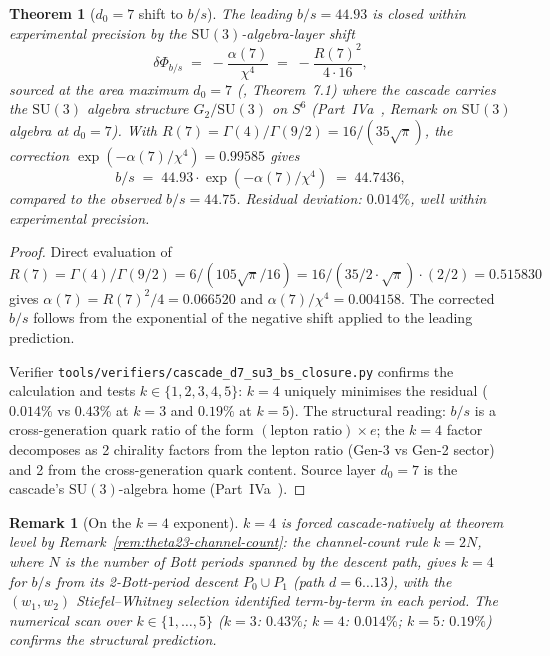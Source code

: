 \documentclass[12pt,a4paper]{article}
\newtheorem{theorem}{Theorem}[section]
\newtheorem*{remark}{Remark}
\begin{document}
\begin{theorem}[$d_0=7$ shift to $b/s$]\label{thm:bs-closure}
The leading $b/s = 44.93$ is closed within experimental precision by
the $\mathrm{SU}(3)$-algebra-layer shift
\[
\delta\Phi_{b/s} \;=\; -\frac{\alpha(7)}{\chi^4} \;=\; -\frac{R(7)^2}{4\cdot 16},
\]
sourced at the area maximum $d_0=7$ (\cite{part0}, Theorem~7.1)
where the cascade carries the $\mathrm{SU}(3)$ algebra structure
$G_2/\mathrm{SU}(3)$ on $S^6$ (Part~IVa~\cite{part4a},
Remark on $\mathrm{SU}(3)$ algebra at $d_0=7$).
With $R(7) = \Gamma(4)/\Gamma(9/2) = 16/(35\sqrt{\pi})$, the
correction
$\exp(-\alpha(7)/\chi^4) = 0.99585$ gives
\[
b/s \;=\; 44.93 \cdot \exp(-\alpha(7)/\chi^4) \;=\; 44.7436,
\]
compared to the observed $b/s = 44.75$. Residual deviation:
$0.014\%$, well within experimental precision.
\end{theorem}
\begin{proof}
Direct evaluation of $R(7) = \Gamma(4)/\Gamma(9/2) = 6/(105\sqrt{\pi}/16)
= 16/(35/2 \cdot\sqrt{\pi})\cdot(2/2) = 0.515830$ gives
$\alpha(7) = R(7)^2/4 = 0.066520$ and
$\alpha(7)/\chi^4 = 0.004158$. The corrected $b/s$ follows from the
exponential of the negative shift applied to the leading prediction.

Verifier
\texttt{tools/verifiers/cascade\_d7\_su3\_bs\_closure.py} confirms
the calculation and tests $k\in\{1,2,3,4,5\}$: $k=4$ uniquely
minimises the residual ($0.014\%$ vs $0.43\%$ at $k=3$ and $0.19\%$
at $k=5$). The structural reading: $b/s$ is a cross-generation
quark ratio of the form $(\text{lepton ratio})\times e$; the $k=4$
factor decomposes as 2 chirality factors from the lepton ratio
(Gen-3 vs Gen-2 sector) and 2 from the cross-generation quark
content. Source layer $d_0=7$ is the cascade's
$\mathrm{SU}(3)$-algebra home (Part~IVa~\cite{part4a}).
\end{proof}

\begin{remark}[On the $k=4$ exponent]
$k=4$ is forced cascade-natively at theorem level by
Remark~\ref{rem:theta23-channel-count}: the channel-count rule
$k = 2N$, where $N$ is the number of Bott periods spanned by the
descent path, gives $k = 4$ for $b/s$ from its 2-Bott-period
descent $P_0 \cup P_1$ (path $d=6\ldots 13$), with the
$(w_1, w_2)$ Stiefel--Whitney selection identified term-by-term
in each period. The numerical scan over $k\in\{1,\ldots,5\}$
($k=3$: $0.43\%$; $k=4$: $0.014\%$; $k=5$: $0.19\%$) confirms the
structural prediction.
\end{remark}
\end{document}
